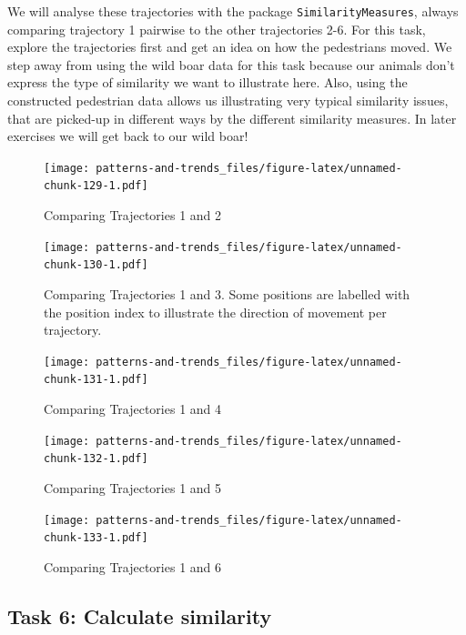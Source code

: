 \documentclass[]{book}
\begin{document}
We will analyse these trajectories with the package
\texttt{SimilarityMeasures}, always comparing trajectory 1 pairwise to
the other trajectories 2-6. For this task, explore the trajectories
first and get an idea on how the pedestrians moved. We step away from
using the wild boar data for this task because our animals don't express
the type of similarity we want to illustrate here. Also, using the
constructed pedestrian data allows us illustrating very typical
similarity issues, that are picked-up in different ways by the different
similarity measures. In later exercises we will get back to our wild
boar!

\begin{figure}
\centering
\texttt{[image: patterns-and-trends\_files/figure-latex/unnamed-chunk-129-1.pdf]}
\caption{\label{fig:unnamed-chunk-129}Comparing Trajectories 1 and 2}
\end{figure}

\begin{figure}
\centering
\texttt{[image: patterns-and-trends\_files/figure-latex/unnamed-chunk-130-1.pdf]}
\caption{\label{fig:unnamed-chunk-130}Comparing Trajectories 1 and 3. Some
positions are labelled with the position index to illustrate the
direction of movement per trajectory.}
\end{figure}

\begin{figure}
\centering
\texttt{[image: patterns-and-trends\_files/figure-latex/unnamed-chunk-131-1.pdf]}
\caption{\label{fig:unnamed-chunk-131}Comparing Trajectories 1 and 4}
\end{figure}

\begin{figure}
\centering
\texttt{[image: patterns-and-trends\_files/figure-latex/unnamed-chunk-132-1.pdf]}
\caption{\label{fig:unnamed-chunk-132}Comparing Trajectories 1 and 5}
\end{figure}

\begin{figure}
\centering
\texttt{[image: patterns-and-trends\_files/figure-latex/unnamed-chunk-133-1.pdf]}
\caption{\label{fig:unnamed-chunk-133}Comparing Trajectories 1 and 6}
\end{figure}

\subsection{Task 6: Calculate
similarity}\label{task-6-calculate-similarity}
\end{document}
